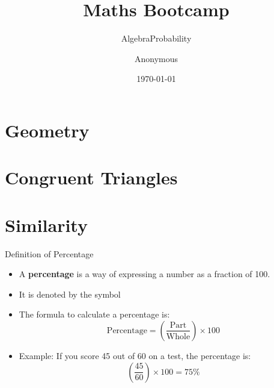 \documentclass{beamer}
\title{Maths Bootcamp}
\author{Anonymous}
\institute{Overleaf}
\date{\today}
\begin{document}
\frame{\titlepage}

\section{Geometry}
\subsection{}
\section{Congruent Triangles}
\section{Similarity }
\subtitle{Algebra}
\subtitle{Probability}

\begin{frame}{Definition of Percentage}
    \begin{itemize}
        \item A \textbf{percentage} is a way of expressing a number as a fraction of 100.
        \item It is denoted by the symbol 
        \item The formula to calculate a percentage is:
        $$
        \text{Percentage} = \left( \frac{\text{Part}}{\text{Whole}} \right) \times 100
        $$
        \item Example: If you score 45 out of 60 on a test, the percentage is:
      $$  
        \left( \frac{45}{60} \right) \times 100 = 75\%
       $$
    \end{itemize}
\end{frame}
\end{document}
